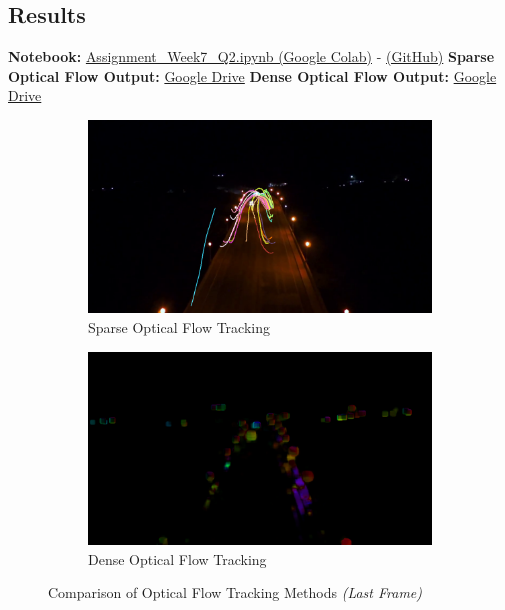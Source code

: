 \documentclass[12pt,a4paper]{article}
\begin{document}
\subsection{Results}

\textbf{Notebook:} \href{https://colab.research.google.com/drive/1e2mMba6YOY2pt4cyBrOAsf8wfL6rVag4?usp=sharing}{Assignment\_Week7\_Q2.ipynb (Google Colab)} - 
\href{https://github.com/bkhanal-11/ties411_cvip_jyu/blob/master/assignment7/src/Assignment_Week7_Q2.ipynb}{(GitHub)}
\newline
\textbf{Sparse Optical Flow Output:} \href{https://drive.google.com/file/d/1iLkjQO8ZW9hpywKb2z5pnCL-cukpZUon/view?usp=sharing}{Google Drive}
\newline
\textbf{Dense Optical Flow Output:} \href{https://drive.google.com/file/d/1LyLgQWyLzUiwqHsQQL1IQbtPpALp8bBU/view?usp=sharing}{Google Drive}

\begin{figure}[htb]
    \centering
    \begin{subfigure}[b]{0.48\textwidth}
        \centering
        \includegraphics[width=\textwidth]{src/sparse_last_frame.png}
        \caption{Sparse Optical Flow Tracking}
    \end{subfigure}
    \hfill
    \begin{subfigure}[b]{0.48\textwidth}
        \centering
        \includegraphics[width=\textwidth]{src/dense_last_frame.png}
        \caption{Dense Optical Flow Tracking}
    \end{subfigure}
    \caption{Comparison of Optical Flow Tracking Methods \textit{(Last Frame)}}
\end{figure}
\end{document}
